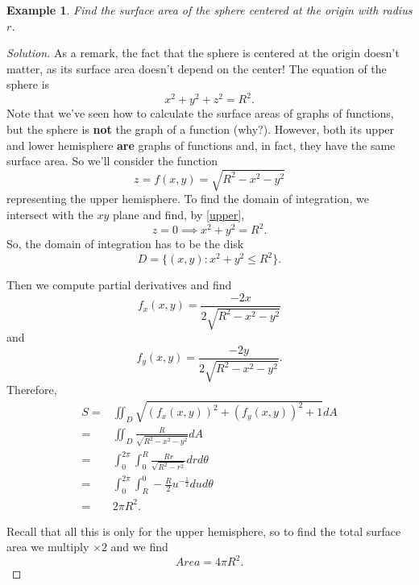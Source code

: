 \documentclass[12pt]{article}
\title{}
\newenvironment{solution}
  {\begin{proof}[Solution]}
  {\end{proof}}
\newtheorem{example}{Example}
\begin{document}
\begin{example}
Find the surface area of the sphere centered at the origin with radius $r$.
\end{example}
\begin{solution}
As a remark, the fact that the sphere is centered at the origin doesn't matter, as its surface area doesn't depend on the center! The equation of the sphere is $$x^2+y^2+z^2=R^2.$$ Note that we've seen how to calculate the surface areas of graphs of functions, but the sphere is \textbf{not} the graph of a function (why?). However, both its upper and lower hemisphere \textbf{are} graphs of functions and, in fact, they have the same surface area. So we'll consider the function \begin{equation}\label{upper}z=f(x,y)=\sqrt{R^2-x^2-y^2}\end{equation}  representing the upper hemisphere. To find the domain of integration, we intersect with the $xy$ plane and find, by \eqref{upper}, $$z=0\implies x^2+y^2=R^2.$$ So, the domain of integration has to be the disk $$D=\{(x,y):x^2+y^2\leq R^2\}.$$

Then we compute partial derivatives and find $$f_x(x,y)=\frac{-2x}{2\sqrt{R^2-x^2-y^2}}$$ and $$f_y(x,y)=\frac{-2y}{2\sqrt{R^2-x^2-y^2}}.$$ Therefore, \begin{align*}
S=&\iint_D\sqrt{(f_x(x,y))^2+(f_y(x,y))^2+1}dA\\
=&\iint_D\frac{R}{\sqrt{R^2-x^2-y^2}}dA\\
=&\int_0^{2\pi}\int_0^R\frac{Rr}{\sqrt{R^2-r^2}}drd\theta\\
=&\int_0^{2\pi}\int_{R}^0-\frac{R}{2}u^{-\frac{1}{2}}dud\theta\\
=&2\pi R^2.
\end{align*}

Recall that all this is only for the upper hemisphere, so to find the total surface area we multiply $\times 2 $ and we find $$Area=4\pi R^2.$$
\end{solution}
\end{document}

